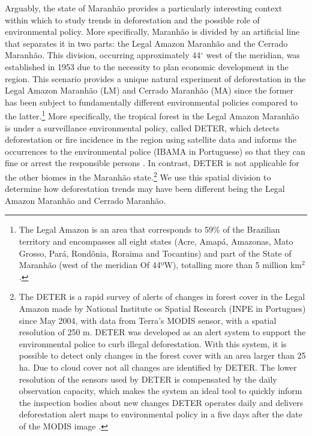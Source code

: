 Arguably, the state of Maranhão provides a particularly interesting context within which to study trends in deforestation and the possible role of environmental policy.  More specifically, Maranhão is divided by an artificial line that separates it in two parts: the Legal Amazon Maranhão and the Cerrado Maranhão. This division, occurring approximately 44$^{\circ}$ west of the meridian, was established in 1953 due to the necessity to plan economic development in the region. This scenario provides a unique natural experiment of deforestation in the Legal Amazon Maranhão (LM) and Cerrado Maranhão (MA) since the former has been subject to fundamentally different environmental policies compared to the latter.\footnote{The Legal Amazon is an area that corresponds to 59$\%$ of the Brazilian territory and encompasses all eight states (Acre, Amapá, Amazonas, Mato Grosso, Pará, Rondônia, Roraima and Tocantins) and part of the State of Maranhão (west of the meridian Of 44ºW), totalling more than 5 million km$^{2}$ \citep{IPEA2}.} More specifically, the tropical forest in the Legal Amazon Maranhão is under a surveillance environmental policy, called DETER, which detects deforestation or fire incidence  in the region using satellite data and informs the occurrences to the environmental police (IBAMA in Portuguese) so that they can fine or arrest the responsible persons \citep{IBAMAwebsite}. In contrast, DETER is not applicable for the other biomes in the Maranhão state.\footnote{The DETER is a rapid survey of alerts of changes in forest cover in the Legal Amazon made by National Institute os Spatial Research (INPE in Portugues) since May 2004, with data from Terra's MODIS sensor, with a spatial resolution of 250 m. DETER was developed as an alert system to support the environmental police to curb illegal deforestation. With this system, it is possible to detect only changes in the forest cover with an area larger than 25 ha. Due to cloud cover not all changes are identified by DETER. The lower resolution of the sensors used by DETER is compensated by the daily observation capacity, which makes the system an ideal tool to quickly inform the inspection bodies about new changes DETER operates daily and delivers deforestation alert maps to environmental policy in a five days after the date of the MODIS image \citep{inpe-deter_2018}.} We use this spatial division to determine how deforestation trends may have been different being the Legal Amazon Maranhão and Cerrado Maranhão.

